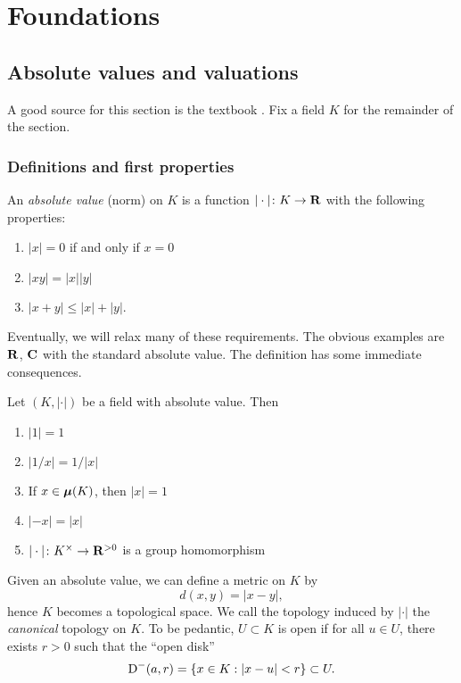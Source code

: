 
\chapter{Foundations}





\section{Absolute values and valuations}

A good source for this section is the textbook \cite{engler-prestel}. 
Fix a field $K$ for the remainder of the section. 


\subsection{Definitions and first properties}

\begin{definition}
An \emph{absolute value} (norm) on $K$ is a function $|\cdot|\colon K\to \mathbf{R}$ 
with the following properties: 
\begin{enumerate}
\item
$|x|=0$ if and only if $x=0$

\item
$|xy|=|x| |y|$

\item $|x+y|\leqslant |x|+|y|$. 
\end{enumerate}
\end{definition}

Eventually, we will relax many of these requirements. The obvious examples 
are $\mathbf{R}$, $\mathbf{C}$ with the standard absolute value. The definition has some 
immediate consequences. 

\begin{lemma}
Let $(K,|\cdot|)$ be a field with absolute value. Then 
\begin{enumerate}
\item $|1|=1$
\item $|1/x|=1/|x|$
\item If $x\in {\bm\mu}(K)$, then $|x|=1$
\item $|-x|=|x|$
\item $|\cdot|\colon K^\times\to \mathbf{R}^{>0}$ is a group homomorphism
\end{enumerate}
\end{lemma}

Given an absolute value, we can define a metric on $K$ by 
\[
  d(x,y) = |x-y| ,
\]
hence $K$ becomes a topological space. We call the topology induced by 
$|\cdot|$ the \emph{canonical} topology on $K$. To be pedantic, $U\subset K$ 
is open if for all $u\in U$, there exists $r>0$ such that the ``open disk''
\[
  \operatorname{D}^-(a,r) = \{x\in K:|x-u|<r\}\subset U .
\]


